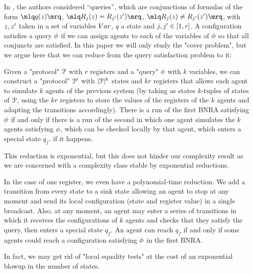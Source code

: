 \begin{remark}
	In \cite{DelzannoST13}, the authors considered ``queries'', which are conjunctions of formulas of the form $\quotemarks{q(\var{z})}$, $\quotemarks{R_j(\var{z}) = R_{j'}(\var{z}')}$, $\quotemarks{R_j(\var{z}) \neq R_{j'}(\var{z}')}$, with $\var{z}, \var{z}'$ taken in a set of variables $\varset$, $q$ a state and $j,j' \in [1,r]$. A configuration satisfies a query $\phi$ if we can assign agents to each of the variables of $\phi$ so that all conjuncts are satisfied.
	In this paper we will only study the "cover problem", but we argue here that we can reduce from the query satisfaction problem to it:
	
	Given a "protocol" $\mathcal{P}$ with $r$ registers and a "query" $\phi$ with $k$ variables, we can construct a "protocol" $\mathcal{P}'$ with $|\mathcal{P}|^k$ states and $kr$ registers that allows each agent to simulate $k$ agents of the previous system (by taking as states $k$-tuples of states of $\mathcal{P}$, using the $kr$ registers to store the values of the registers of the $k$ agents and adapting the transitions accordingly).
	There is a run of the first BNRA satisfying $\phi$ if and only if there is a run of the second in which one agent simulates the $k$ agents satisfying $\phi$, which can be checked locally by that agent, which enters a special state $q_f$. if it happens. 
	
	This reduction is exponential, but this does not hinder our complexity result as we are concerned with a complexity class stable by exponential reductions.
	
	In the case of one register, we even have a polynomial-time reduction: We add a transition from every state to a sink state allowing an agent to stop at any moment and send its local configuration (state and register value) in a single broadcast.
	Also, at any moment, an agent may enter a series of transitions in which it receives the configurations of $k$ agents and checks that they satisfy the query, then enters a special state $q_f$. An agent can reach $q_f$ if and only if some agents could reach a configuration satisfying $\phi$ in the first BNRA.
\end{remark}

In fact, we may get rid of "local equality tests" at the cost of an exponential blowup in the number of states.

